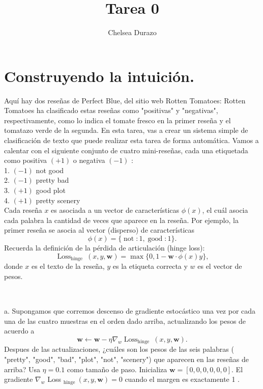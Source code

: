 \documentclass{article}
\title{Tarea 0}
\author{Chelsea Durazo}
\begin{document}
\maketitle
\section{Construyendo la intuición.}

Aquí hay dos reseñas de Perfect Blue, del sitio web Rotten Tomatoes:
Rotten Tomatoes ha clasificado estas reseñas como "positivas" y "negativas", respectivamente, como lo indica el tomate fresco en la primer reseña y el tomatazo verde de la segunda. En esta tarea, vas a crear un sistema simple de clasificación de texto que puede realizar esta tarea de forma automática. Vamos a calentar con el siguiente conjunto de cuatro mini-reseñas, cada una etiquetada como positiva $(+1)$ o negativa $(-1)$ :\\
1. $(-1)$ not good\\
2. $(-1)$ pretty bad\\
3. $(+1)$ good plot\\
4. $(+1)$ pretty scenery\\


Cada reseña $x$ es asociada a un vector de características $\phi(x)$, el cuál asocia cada palabra la cantidad de veces que aparece en la reseña. Por ejemplo, la primer reseña se asocia al vector (disperso) de características
$$
\phi(x)=\{\operatorname{not}: 1, \operatorname{good}: 1\} .
$$
Recuerda la definición de la pérdida de articulación (hinge loss):\\
\[\operatorname{Loss}_{\text {hinge }}(x, y, \boldsymbol{w})=\max \{0,1-\boldsymbol{w} \cdot \phi(x) y\},\]
donde $x$ es el texto de la reseña, $y$ es la etiqueta correcta y $w$ es el vector de pesos.\\\

\subsection{}
a. Supongamos que corremos descenso de gradiente estocástico una vez por cada una de las cuatro muestras en el orden dado arriba, actualizando los pesos de acuerdo a
$$
\boldsymbol{w} \leftarrow \boldsymbol{w}-\eta \nabla_w \operatorname{Loss}_{\text {hinge }}(x, y, \boldsymbol{w}) .
$$
Despues de las actualizaciones, ¿cuáles son los pesos de las seis palabras ( "pretty", "good", "bad", "plot", "not", "scenery") que aparecen en las reseñas de arriba?
Usa $\eta=0.1$ como tamaño de paso.
Inicializa $\boldsymbol{w}=[0,0,0,0,0,0]$.
El gradiente $\nabla_w$ Loss $_{\text {hinge }}(x, y, \boldsymbol{w})=0$ cuando el margen es exactamente 1 .\\
\end{document}
